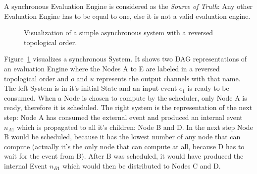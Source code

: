 A synchronous Evaluation Engine is considered as the \emph{Source of Truth}:
Any other Evaluation Engine has to be equal to one, else it is not a valid evaluation engine.

\begin{figure}
  \caption{Visualization of a simple asynchronous system with a reversed topological order.}
\label{fig:chap3:sec_sync:visual_dag}
\end{figure}


Figure~\ref{fig:chap3:sec_sync:visual_dag} visualizes a synchronous System.
It shows two DAG representations of an evaluation Engine  where the Nodes A to E are labeled in a reversed topological order and \(o\) and \(u\) represents the output channels with that name.
The left System is in it's initial State and an input event \(e_1\) is ready to be consumed.
When a Node is chosen to compute by the scheduler, only Node A is ready, therefore it is scheduled.
The right system is the representation of the next step: Node A has consumed the external event and produced an internal event \(n_{A1}\) which is propagated to all it's children: Node B and D.
In the next step Node B would be scheduled, because it has the lowest number of any node that can compute (actually it's the only node that can compute at all, because D has to wait for the event from B).
After B was scheduled, it would have produced the internal Event \(n_{B1}\) which would then be distributed to Nodes C and D.

